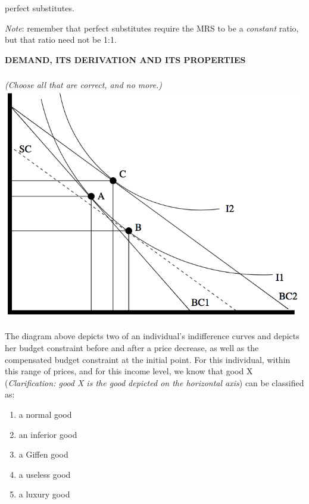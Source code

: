 \documentclass[]{article}
\begin{document}
perfect substitutes.

\emph{Note}: remember that perfect substitutes require the MRS to be a
\emph{constant} ratio, but that ratio need not be 1:1.

\textbf{DEMAND, ITS DERIVATION AND ITS PROPERTIES}

\hypertarget{section-7}{%
\subsubsection{}\label{section-7}}

\emph{(Choose all that are correct, and no more.)}
\includegraphics[width=\textwidth,height=4in]{../picsfigs/pricechangeneteffect.png}

The diagram above depicts two of an individual's indifference curves and
depicts her budget constraint before and after a price decrease, as well
as the compensated budget constraint at the initial point. For this
individual, within this range of prices, and for this income level, we
know that good X (\emph{Clarification: good X is the good depicted on
the horizontal axis}) can be classified as:

\begin{enumerate}
\def\labelenumi{\Alph{enumi}.}
\item
  a normal good
\item
  an inferior good
\item
  a Giffen good
\item
  a useless good
\item
  a luxury good
\end{enumerate}
\end{document}
